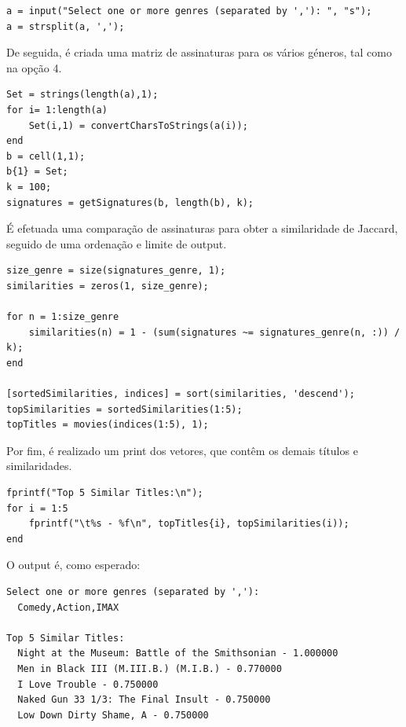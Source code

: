 \documentclass[portuguese, 11pt, a4paper,titlepage, oneside]{article}
\begin{document}
\begin{lstlisting}[style=Matlab-editor]
a = input("Select one or more genres (separated by ','): ", "s");
a = strsplit(a, ',');
\end{lstlisting}

De seguida, é criada uma matriz de assinaturas para os vários géneros, tal como na opção 4.
\begin{lstlisting}[style=Matlab-editor]
Set = strings(length(a),1);
for i= 1:length(a)
    Set(i,1) = convertCharsToStrings(a(i));
end
b = cell(1,1);
b{1} = Set;
k = 100;
signatures = getSignatures(b, length(b), k);
\end{lstlisting}

É efetuada uma comparação de assinaturas para obter a similaridade de Jaccard, seguido de uma ordenação e limite de output.
\begin{lstlisting}[style=Matlab-editor]
size_genre = size(signatures_genre, 1);
similarities = zeros(1, size_genre);

for n = 1:size_genre
    similarities(n) = 1 - (sum(signatures ~= signatures_genre(n, :)) / k);
end

[sortedSimilarities, indices] = sort(similarities, 'descend');
topSimilarities = sortedSimilarities(1:5);
topTitles = movies(indices(1:5), 1);
\end{lstlisting}

Por fim, é realizado um print dos vetores, que contêm os demais títulos e similaridades.
\begin{lstlisting}[style=Matlab-editor]
fprintf("Top 5 Similar Titles:\n");
for i = 1:5
    fprintf("\t%s - %f\n", topTitles{i}, topSimilarities(i));
end
\end{lstlisting}

O output é, como esperado:
\begin{lstlisting}[style=Matlab-editor]
Select one or more genres (separated by ','): 
  Comedy,Action,IMAX

Top 5 Similar Titles:
  Night at the Museum: Battle of the Smithsonian - 1.000000
  Men in Black III (M.III.B.) (M.I.B.) - 0.770000
  I Love Trouble - 0.750000
  Naked Gun 33 1/3: The Final Insult - 0.750000
  Low Down Dirty Shame, A - 0.750000
\end{lstlisting}
\end{document}
